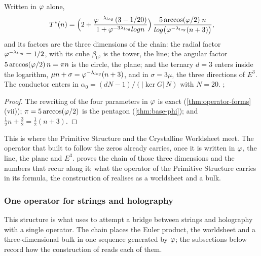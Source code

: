 \begin{proposition}\label{prop:hp-three-dimensions}
Written in $\varphi$ alone,
\[
  T^*(n)=\Bigl(2+\frac{\varphi^{-\lambda_{log}}\,(3-1/20)}{1+\varphi^{-3\lambda_{log}}log n}\Bigr)
  \,\frac{5\arccos(\varphi/2)\;n}{log\bigl(\varphi^{-\lambda_{log}}(n+3)\bigr)} ,
\]
and its factors are the three dimensions of the chain: the radial factor
$\varphi^{-\lambda_{log}}=1/2$, with its cube $\beta_0$, is the tower, the line; the angular
factor $5\arccos(\varphi/2)\,n=\pi n$ is the circle, the plane; and the ternary $d=3$
enters inside the logarithm, $\mu n+\sigma=\varphi^{-\lambda_{log}}(n+3)$, and in $\sigma=3\mu$,
the three directions of $E^3$.  The conductor enters in
$\alpha_0=(dN-1)/(|\ker G|\,N)$ with $N=20$.
;
%
\end{proposition}

\begin{proof}
The rewriting of the four parameters in $\varphi$ is exact
(\cref{thm:operator-forms}\,(vii)); $\pi=5\arccos(\varphi/2)$ is the pentagon
(\cref{thm:base-phi}); and $\tfrac12n+\tfrac32=\tfrac12(n+3)$.
\end{proof}

This is where the Primitive Structure and the Crystalline Worldsheet meet.  The
operator that \cite{gonzalez25hp} built to follow the zeros already carries, once it
is written in $\varphi$, the line, the plane and $E^3$.   proves the
chain of those three dimensions and the numbers that recur along it; what the operator of the Primitive Structure carries in its formula, the construction of
\cite{gonzalez26cw} realises as a worldsheet and a bulk.


\subsubsection{One operator for strings and holography}\label{ssec:one-operator}

This structure is what \cite{gonzalez26cw} uses to attempt a bridge between strings and
holography with a single operator.  The chain places the Euler product, the worldsheet
and a three-dimensional bulk in one sequence generated by $\varphi$; the subsections
below record how the construction of \cite{gonzalez26cw} reads each of them.


